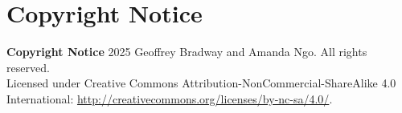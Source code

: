\chapter*{Copyright Notice}
\label{copyright}
\thispagestyle{plain}

\begin{center}
    \textbf{Copyright Notice}
    \vspace{1cm}
    \textcopyright{} 2025 Geoffrey Bradway and Amanda Ngo. All rights reserved.\\
    Licensed under Creative Commons Attribution-NonCommercial-ShareAlike 4.0 International:
    \url{http://creativecommons.org/licenses/by-nc-sa/4.0/}.
\end{center}
